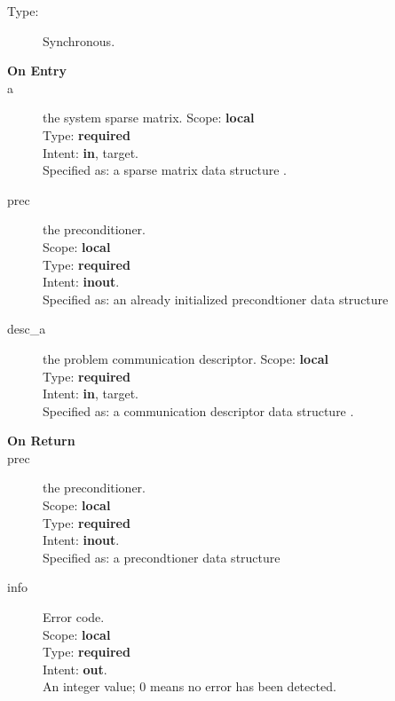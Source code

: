

\begin{description}
\item[Type:] Synchronous.
\item[\bf On Entry]
\item[a] the system sparse matrix.
Scope: {\bf local} \\
Type: {\bf required}\\
Intent: {\bf in}, target.\\
Specified as: a sparse matrix data structure \spdata.
\item[prec] the preconditioner.\\
Scope: {\bf local} \\
Type: {\bf required}\\
Intent: {\bf inout}.\\
Specified as: an already initialized precondtioner data structure \precdata\\
\item[desc\_a] the problem communication descriptor. 
Scope: {\bf local} \\
Type: {\bf required}\\
Intent: {\bf in}, target.\\
Specified as: a communication descriptor data structure \descdata.
\end{description}

\begin{description}
\item[\bf On Return]
\item[prec] the preconditioner.\\
Scope: {\bf local} \\
Type: {\bf required}\\
Intent: {\bf inout}.\\
Specified as: a precondtioner data structure \precdata\\
\item[info] Error code.\\
Scope: {\bf local} \\
Type: {\bf required} \\
Intent: {\bf out}.\\
An integer value; 0 means no error has been detected. 
\end{description}



